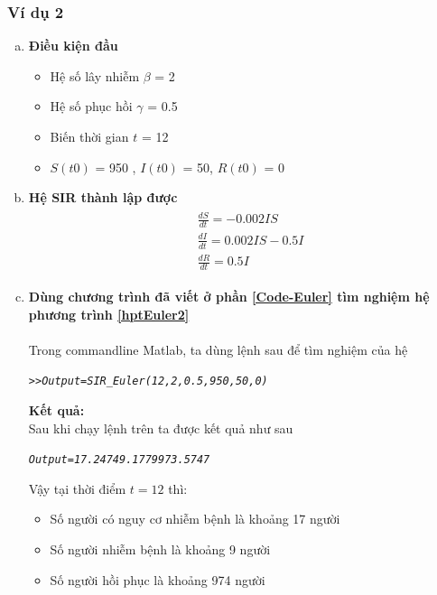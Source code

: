 \subsubsection{Ví dụ 2}\label{vd2-ppEuler}
\begin{enumerate}[a)]
\item \textbf{Điều kiện đầu}
	\begin{itemize}
		\item Hệ số lây nhiễm $ \beta $ = 2
		\item Hệ số phục hồi $ \gamma $ = 0.5
		\item Biến thời gian $ t $ = 12
		\item $ S(t0) $ = 950 , $ I(t0) $ = 50, $ R(t0) $ = 0
	\end{itemize}

\item \textbf {Hệ SIR thành lập được}
	\begin{align} \label{hptEuler2} \tag{II}
	    \begin{split} 
	        &\frac{dS}{dt} = -0.002IS \\
	        &\frac{dI}{dt} = 0.002IS - 0.5I \\
	        &\frac{dR}{dt} = 0.5I
	    \end{split}
	\end{align}
\item \textbf{Dùng chương trình đã viết ở phần \ref{Code-Euler} tìm nghiệm hệ phương trình \eqref{hptEuler2} }\\
	\\Trong commandline Matlab, ta dùng lệnh sau để tìm nghiệm của hệ
	\begin{mdframed}[hidealllines=true,backgroundcolor=magenta!10]
	\begin{alltt}
	\textit{
	>> Output = SIR_Euler(12,2,0.5,950,50,0)
	}
	\end{alltt}
	\end{mdframed}

	\textbf{Kết quả:}\\
	Sau khi chạy lệnh trên ta được kết quả như sau
	\begin{mdframed}[hidealllines=true,backgroundcolor=blue!10]
	\begin{alltt}
	\textit{
	 Output = 17.2474    9.1779  973.5747
	}
	\end{alltt}
	\end{mdframed}
	Vậy tại thời điểm $ t = 12 $ thì:
	\begin{itemize}
		\item Số người có nguy cơ nhiễm bệnh là khoảng 17 người
		\item Số người nhiễm bệnh là khoảng 9 người
		\item Số người hồi phục là khoảng 974 người
	\end{itemize}


\end{enumerate}
